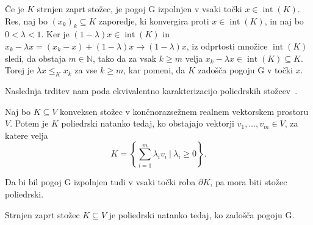 \documentclass[mat2, tisk]{fmfdelo}
\newcommand{\N}{\mathbb{N}}
\begin{document}
Če je $K$ strnjen zaprt stožec, je pogoj G izpolnjen v vsaki točki
$x\in\operatorname{int}(K)$. 
Res, naj bo $(x_k)_k\subseteq K$ zaporedje,
ki konvergira proti $x\in\operatorname{int}(K)$,
in naj bo $0<\lambda<1$.
Ker je $(1-\lambda)x\in\operatorname{int}(K)$ in
$x_k-\lambda x
=
(x_k-x)+(1-\lambda)x
\longrightarrow
(1-\lambda)x$,
iz odprtosti množice $\operatorname{int}(K)$ sledi,
da obstaja $m\in\N$, tako da za vsak $k\geq m$ velja
$x_k-\lambda x\in\operatorname{int}(K)\subseteq K$.
Torej je $\lambda x\leq_K x_k$ za vse $k\geq m$,
kar pomeni, da $K$ zadošča pogoju G v točki $x$.

Naslednja trditev nam poda ekvivalentno karakterizacijo poliedrskih stožcev~\cite{rockafellar}.
\begin{trditev}\label{trd:koncno_generiran_stozec}
Naj bo $K\subseteq V$ konveksen stožec v končnorazsežnem
realnem vektorskem prostoru $V$.
Potem je $K$ poliedrski natanko tedaj, ko obstajajo
vektorji $v_1,\ldots,v_m\in V$, za katere velja
\[
K=\left\{
\sum_{i=1}^{m}\lambda_i v_i ~|~ 
\lambda_i\geq0
\right\}.
\]
\end{trditev}

Da bi bil pogoj G izpolnjen tudi v vsaki točki
roba $\partial K$, pa mora biti stožec poliedrski.

\begin{lema}\label{lema:pogoj_G_poliedrski}
Strnjen zaprt stožec $K\subseteq V$ je poliedrski natanko tedaj, ko
zadošča pogoju G.
\end{lema}
\end{document}
